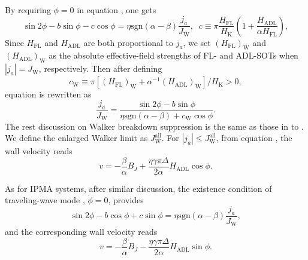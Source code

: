 \documentclass[12pt]{iopart}
\begin{document}
By requiring $\dot{\phi}=0$ in equation , one gets
\begin{equation}\label{phi_dot_0_FL_and_ADL_SOTs}
\sin 2\phi-b\sin\phi-c\cos\phi=\eta \mathrm{sgn}(\alpha-\beta)\frac{j_a}{J_\mathrm{W}}, \;\; c\equiv
\pi\frac{H_{\mathrm{FL}}}{H_{\mathrm{K}}}\left(1+\frac{H_{\mathrm{ADL}}}{\alpha H_{\mathrm{FL}}}\right),
\end{equation}
Since $H_{\mathrm{FL}}$ and $H_{\mathrm{ADL}}$ are both proportional to $j_a$, 
we set $\left(H_{\mathrm{FL}}\right)_{\mathrm{W}}$ and
$\left(H_{\mathrm{ADL}}\right)_{\mathrm{W}}$ as the absolute effective-field strengths of FL- and ADL-SOTs
when $|j_a|=J_{\mathrm{W}}$, respectively.
Then after defining
\begin{equation}\label{b_W_FL_and_ADL_SOTs}
c_{\mathrm{W}}\equiv \pi\left[\left(H_{\mathrm{FL}}\right)_{\mathrm{W}}+\alpha^{-1}\left(H_{\mathrm{ADL}}\right)_{\mathrm{W}}\right]/ H_{\mathrm{K}}>0,
\end{equation}
equation  is rewritten as
\begin{equation}\label{Je_JW_FL_and_ADL_SOTs}
\frac{j_a}{J_{\mathrm{W}}} =\frac{\sin 2\phi-b\sin\phi}{\eta \mathrm{sgn}(\alpha-\beta)+c_{\mathrm{W}}\cos\phi}.
\end{equation}
The rest discussion on Walker breakdown suppression is the same as 
those in  to .
We define the enlarged Walker limit as $J_{\mathrm{W}}^{\mathrm{all}}$.
For $|j_a|\le J_{\mathrm{W}}^{\mathrm{all}}$, from equation , 
the wall velocity reads
\begin{equation}\label{v_all3_PMA}
v=-\frac{\beta}{\alpha}B_J+\frac{\eta\gamma\pi\Delta}{2\alpha}H_{\mathrm{ADL}}\cos\phi.
\end{equation}

As for IPMA systems, after similar discussion, the existence condition of traveling-wave mode
, $\dot{\phi}=0$, provides
\begin{equation}\label{phi_dot_0_all3_IPMA}
\sin 2\phi-b\cos\phi+c\sin\phi=\eta \mathrm{sgn}(\alpha-\beta)\frac{j_a}{J_\mathrm{W}},
\end{equation}
and the corresponding wall velocity reads
\begin{equation}\label{v_all3_IPMA}
v=-\frac{\beta}{\alpha}B_J-\frac{\eta\gamma\pi\Delta}{2\alpha}H_{\mathrm{ADL}}\sin\phi.
\end{equation}
\end{document}
